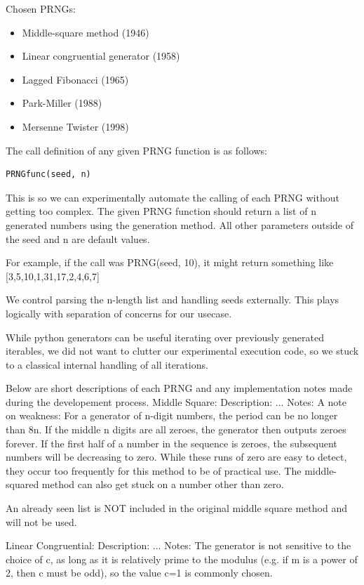 \documentclass[conference]{IEEEtran}
\begin{document}
Chosen PRNGs:
\begin{itemize}
  \item Middle-square method (1946)
  \item Linear congruential generator (1958)
  \item Lagged Fibonacci (1965)
  \item Park-Miller (1988)
  \item Mersenne Twister (1998)
\end{itemize}

The call definition of any given PRNG function is as follows:
\begin{lstlisting}
PRNGfunc(seed, n) 
\end{lstlisting}
This is so we can experimentally automate the calling of each PRNG without getting too complex.
The given PRNG function should return a list of n generated numbers using the generation method.
All other parameters outside of the seed and n are default values.

For example, if the call was PRNG(seed, 10),
it might return something like
[3,5,10,1,31,17,2,4,6,7]

We control parsing the n-length list and handling seeds externally. 
This plays logically with separation of concerns for our usecase.

While python generators can be useful iterating over previously generated iterables,
we did not want to clutter our experimental execution code, so we stuck to a classical
internal handling of all iterations.

Below are short descriptions of each PRNG and any implementation notes made during the developement process.
Middle Square:
Description:
...
Notes:
A note on weakness: For a generator of n-digit numbers, the period can be no longer than 8n. If the middle n digits are all zeroes, 
the generator then outputs zeroes forever. If the first half of a number in the sequence is zeroes, the subsequent
numbers will be decreasing to zero. While these runs of zero are easy to detect, they occur too frequently for this
method to be of practical use. The middle-squared method can also get stuck on a number other than zero.

An already seen list is NOT included in the original middle square method and will not be used.

Linear Congruential:
Description:
...
Notes:
The generator is not sensitive to the choice of c, 
as long as it is relatively prime to the modulus 
(e.g. if m is a power of 2, then c must be odd), 
so the value c=1 is commonly chosen.
\end{document}
